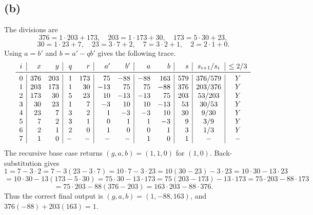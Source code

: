 \documentclass[11pt]{article}
\begin{document}
\subsection*{(b)} The divisions are
\[
376=1\cdot203+173,\quad203=1\cdot173+30,\quad173=5\cdot30+23,
\]
\[
30=1\cdot23+7,\quad23=3\cdot7+2,\quad7=3\cdot2+1,\quad2=2\cdot1+0.
\]
Using $a=b'$ and $b=a'-qb'$ gives the following trace.
\[
\begin{array}{c|rr|rr|rr|rr|r|c|c}
i&x&y&q&r&a'&b'&a&b&s& s_{i+1}/s_i&\le2/3\\\midrule
0&376&203&1&173&75&-88&-88&163&579&376/579&Y\\
1&203&173&1&30&-13&75&75&-88&376&203/376&Y\\
2&173&30&5&23&10&-13&-13&75&203&53/203&Y\\
3&30&23&1&7&-3&10&10&-13&53&30/53&Y\\
4&23&7&3&2&1&-3&-3&10&30&9/30&Y\\
5&7&2&3&1&0&1&1&-3&9&3/9&Y\\
6&2&1&2&0&1&0&0&1&3&1/3&Y\\
7&1&0&-&-&-&-&1&0&1&-&-\\
\end{array}
\]
The recursive base case returns $(g,a,b)=(1,1,0)$ for $(1,0)$.  Back-substitution gives
\[
1=7-3\cdot2=7-3(23-3\cdot7)=10\cdot7-3\cdot23
=10(30-23)-3\cdot23=10\cdot30-13\cdot23
\]
\[
=10\cdot30-13(173-5\cdot30)=75\cdot30-13\cdot173
=75(203-173)-13\cdot173=75\cdot203-88\cdot173
\]
\[
=75\cdot203-88(376-203)=163\cdot203-88\cdot376.
\]
Thus the correct final output is $\boxed{(g,a,b)=(1,-88,163)}$, and
$376(-88)+203(163)=1$.
\end{document}
